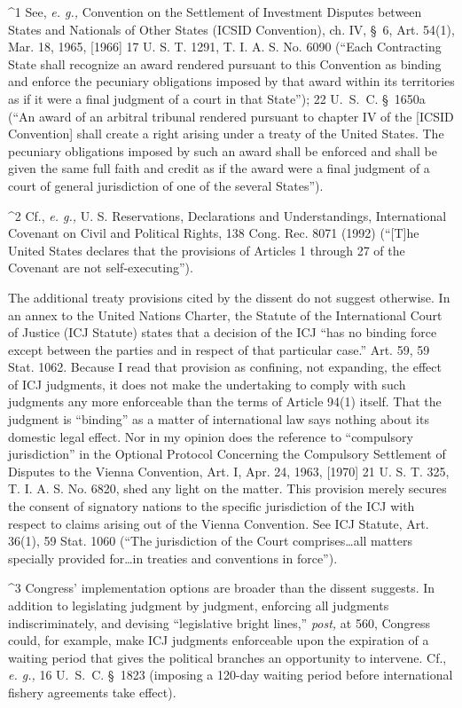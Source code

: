 {{^1 See, \emph{e. g.,} Convention on the Settlement of Investment Disputes
between States and Nationals of Other States (ICSID Convention), ch. IV,
\S~6, Art. 54(1), Mar. 18, 1965, [1966] 17 U. S. T. 1291, T. I. A. S.
No. 6090 (``Each Contracting State shall recognize an award rendered
pursuant to this Convention as binding and enforce the pecuniary
obligations imposed by that award within its territories as if it were
a final judgment of a court in that State''); 22 U.~S.~C. \S~1650a
(``An award of an arbitral tribunal rendered pursuant to chapter IV of
the [ICSID Convention] shall create a right arising under a treaty of
the United States. The pecuniary obligations imposed by such an award
shall be enforced and shall be given the same full faith and credit as
if the award were a final judgment of a court of general jurisdiction of
one of the several States'').

^2 Cf., \emph{e. g.,} U. S. Reservations, Declarations and
Understandings, International Covenant on Civil and Political Rights,
138 Cong. Rec. 8071 (1992) (``[T]he United States declares that
the provisions of Articles 1 through 27 of the Covenant are not
self-executing'').

  The additional treaty provisions cited by the dissent do not suggest
otherwise. In an annex to the United Nations Charter, the Statute of
the International Court of Justice (ICJ Statute) states that a decision
of the ICJ ``has no binding force except between the parties and
in respect of that particular case.'' Art. 59, 59 Stat. 1062.
Because I read that provision as confining, not expanding, the effect
of ICJ judgments, it does not make the undertaking to comply with
such judgments any more enforceable than the terms of Article 94(1)
itself. That the judgment is ``binding'' as a matter of international
law says nothing about its domestic legal effect. Nor in my opinion
does the reference to ``compulsory jurisdiction'' in the Optional
Protocol Concerning the Compulsory Settlement of Disputes to the Vienna
Convention, Art. I, Apr. 24, 1963, [1970] 21 U. S. T. 325, T. I. A. S.
No. 6820, shed any light on the matter. This provision merely secures
the consent of signatory nations to the specific jurisdiction of the ICJ
with respect to claims arising out of the Vienna Convention. See ICJ
Statute, Art. 36(1), 59 Stat. 1060 (``The jurisdiction of the Court
comprises\dots all matters specially provided for\dots in treaties
and conventions in force'').

^3 Congress' implementation options are broader than the dissent
suggests. In addition to legislating judgment by judgment, enforcing
all judgments indiscriminately, and devising ``legislative bright
lines,'' \emph{post,} at 560, Congress could, for example, make ICJ
judgments enforceable upon the expiration of a waiting period that
gives the political branches an opportunity to intervene. Cf., \emph{e.
g.,} 16 U.~S.~C. \S~1823 (imposing a 120-day waiting period before
international fishery agreements take effect).\newpage 

}}
